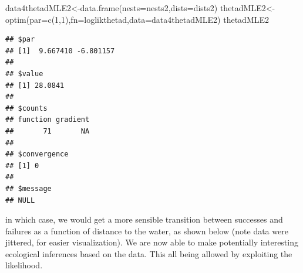 \documentclass[
]{book}
\newenvironment{Shaded}{\begin{snugshade}}{\end{snugshade}}
\newcommand{\AttributeTok}[1]{\textcolor[rgb]{0.77,0.63,0.00}{#1}}
\newcommand{\DecValTok}[1]{\textcolor[rgb]{0.00,0.00,0.81}{#1}}
\newcommand{\FloatTok}[1]{\textcolor[rgb]{0.00,0.00,0.81}{#1}}
\newcommand{\FunctionTok}[1]{\textcolor[rgb]{0.00,0.00,0.00}{#1}}
\newcommand{\NormalTok}[1]{#1}
\newcommand{\OtherTok}[1]{\textcolor[rgb]{0.56,0.35,0.01}{#1}}
\newcommand{\SpecialCharTok}[1]{\textcolor[rgb]{0.00,0.00,0.00}{#1}}
\newcommand{\StringTok}[1]{\textcolor[rgb]{0.31,0.60,0.02}{#1}}
\begin{document}
\begin{Shaded}
\begin{Highlighting}[]
\NormalTok{data4thetadMLE2}\OtherTok{\textless{}{-}}\FunctionTok{data.frame}\NormalTok{(}\AttributeTok{nests=}\NormalTok{nests2,}\AttributeTok{dists=}\NormalTok{dists2)}
\NormalTok{thetadMLE2}\OtherTok{\textless{}{-}}\FunctionTok{optim}\NormalTok{(}\AttributeTok{par=}\FunctionTok{c}\NormalTok{(}\DecValTok{1}\NormalTok{,}\DecValTok{1}\NormalTok{),}\AttributeTok{fn=}\NormalTok{loglikthetad,}\AttributeTok{data=}\NormalTok{data4thetadMLE2)}
\NormalTok{thetadMLE2}
\end{Highlighting}
\end{Shaded}

\begin{verbatim}
## $par
## [1]  9.667410 -6.801157
## 
## $value
## [1] 28.0841
## 
## $counts
## function gradient 
##       71       NA 
## 
## $convergence
## [1] 0
## 
## $message
## NULL
\end{verbatim}

in which case, we would get a more sensible transition between successes and failures as a function of distance to the water, as shown below (note data were jittered, for easier visualization). We are now able to make potentially interesting ecological inferences based on the data. This all being allowed by exploiting the likelihood.

\begin{Shaded}
\end{Shaded}
\end{document}
